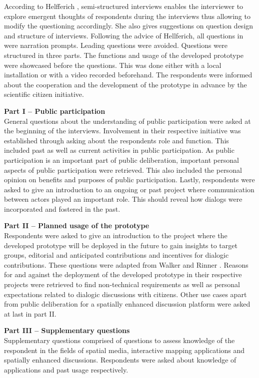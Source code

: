 According to Helfferich \cite{helfferich2005}, semi-structured interviews enables the interviewer to explore emergent thoughts of respondents during the interviews thus allowing to modify the questioning accordingly.  She also gives suggestions on question design and structure of interviews. Following the advice of Hellferich, all questions in were narration prompts. Leading questions were avoided. Questions were structured in three parts. The functions and usage of the developed prototype were showcased before the questions. This was done either with a local installation or with a video recorded beforehand. The respondents were informed about the cooperation and the development of the prototype in advance by the scientific citizen initiative.

\textbf{Part I -- Public participation}\\
General questions about the understanding of public participation were asked at the beginning of the interviews. Involvement in their respective initiative was established through asking about the respondents role and function. This included past as well as current activities in public participation. As public participation is an important part of public deliberation, important personal aspects of public participation were retrieved. This also included the personal opinion on benefits and purposes of public participation. Lastly, respondents were asked to give an introduction to an ongoing or past project where communication between actors played an important role. This should reveal how dialogs were incorporated and fostered in the past.

\textbf{Part II -- Planned usage of the prototype}\\
Respondents were asked to give an introduction to the project where the developed prototype will be deployed in the future to gain insights to target groups, editorial and anticipated contributions and incentives for dialogic contributions. These questions were adapted from Walker and Rinner \cite{Walker2013Qualitative}. Reasons for and against the deployment of the developed prototype in their respective projects were retrieved to find non-technical requirements as well as personal expectations related to dialogic discussions with citizens. Other use cases apart from public deliberation for a spatially enhanced discussion platform were asked at last in part II.

\textbf{Part III -- Supplementary questions}\\
Supplementary questions comprised of questions to assess knowledge of the respondent in the fields of spatial media, interactive mapping applications and spatially enhanced discussions. Respondents were asked about knowledge of applications and past usage respectively.


